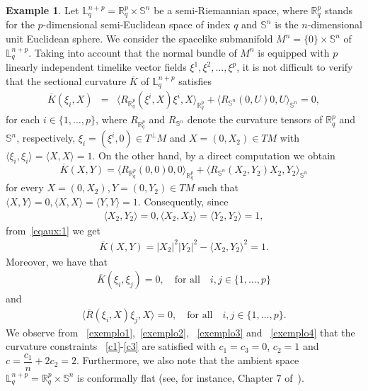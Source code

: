 \documentclass[leqno,11pt]{amsart}
\theoremstyle{plain}
\theoremstyle{definition}
\newtheorem{example}[theorem]{\indent\sc Example}
\numberwithin{equation}{section}
\begin{document}
\begin{example}
Let $\mathbb{L}_{q}^{n+p}=\mathbb{R}_{q}^{p}\times\mathbb{S}^{n}$ be a semi-Riemannian space, where $\mathbb{R}_{q}^{p}$ stands for the $p$-dimensional semi-Euclidean space of index $q$ and $\mathbb{S}^{n}$ is the $n$-dimensional unit Euclidean sphere. We consider the spacelike submanifold $M^{n}=\{0\}\times\mathbb{S}^{n}$ of $\mathbb{L}_{q}^{n+p}$. Taking into account that the normal bundle of $M^{n}$ is equipped with $p$ linearly independent timelike vector fields $\xi^{1},\xi^{2},\ldots,\xi^{p}$, it is not difficult to verify that the sectional curvature $\overline{K}$ of $\mathbb{L}_{q}^{n+p}$ satisfies
\begin{eqnarray}\label{exemplo1}
\overline{K}\left(\xi_{i},X\right)&=&\langle R_{\mathbb{R}_{q}^{p}}(\xi^{i},X)\xi^{i},X\rangle_{\mathbb{R}_{q}^{p}}+\langle R_{\mathbb{S}^{n}}(0,U)0,U\rangle_{\mathbb{S}^{n}}=0,
\end{eqnarray}
for each $i\in\{1,\ldots,p\}$, where $R_{\mathbb{R}_{q}^{p}}$ and $R_{\mathbb{S}^{n}}$ denote the curvature tensors of $\mathbb{R}_{q}^{p}$ and $\mathbb{S}^{n}$, respectively, $\xi_{i}=(\xi^{i},0)\in T^{\perp}M$ and $X=(0,X_{2})\in TM$ with $\langle \xi_{i},\xi_{i}\rangle=\langle X,X\rangle=1$.
On the other hand, by a direct computation we obtain
\begin{equation}\label{eqaux:1}
\overline{K}(X,Y)=\langle R_{\mathbb{R}_{q}^{p}}(0,0)0,0\rangle_{\mathbb{R}_{q}^{p}}+\langle R_{\mathbb{S}^{n}}(X_{2},Y_{2})X_{2},Y_{2}\rangle_{\mathbb{S}^{n}}
\end{equation}
for every $X=(0,X_{2}), Y=(0,Y_{2})\in TM$ such that $\langle X,Y\rangle=0,\langle X,X\rangle=\langle Y,Y\rangle=1$. Consequently, since
\begin{eqnarray*}
\langle X_{2},Y_{2}\rangle=0,\langle X_{2},X_{2}\rangle=\langle Y_{2},Y_{2}\rangle=1,
\end{eqnarray*}
from~\eqref{eqaux:1} we get
\begin{eqnarray}\label{exemplo2}
\overline{K}(X,Y)=|X_{2}|^{2}|Y_{2}|^{2}-\langle X_{2},Y_{2}\rangle^{2}=1.
\end{eqnarray}
Moreover, we have that
\begin{eqnarray}\label{exemplo3}
\overline{K}(\xi_{i},\xi_{j})=0,\quad\mbox{for all}\quad i,j\in \{1,\ldots,p\}
\end{eqnarray}
and
\begin{eqnarray}\label{exemplo4}
\langle \overline{R}(\xi_{i}, X)\xi_{j},X\rangle=0,\quad\mbox{for all}\quad i,j\in \{1,\ldots,p\}.
\end{eqnarray}
We observe from ~\eqref{exemplo1},~\eqref{exemplo2}, ~\eqref{exemplo3} and ~\eqref{exemplo4} that the curvature constraints ~\eqref{c1}-\eqref{c3} are satisfied with $c_{1}=c_{3}=0$, $c_{2}=1$ and $c=\dfrac{c_{1}}{n}+2c_{2}=2$. Furthermore, we also note that the ambient space $\mathbb{L}_{q}^{n+p}=\mathbb{R}_{q}^{p}\times\mathbb{S}^{n}$ is conformally flat (see, for instance, Chapter $7$ of~\cite{Dajczer:90}).
\end{example}
\end{document}
